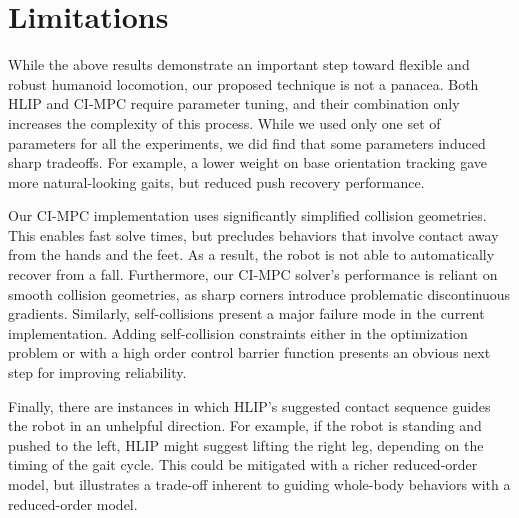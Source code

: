 \section{Limitations} \label{sec:limitations}

While the above results demonstrate an important step toward flexible and robust humanoid locomotion, our proposed technique is not a panacea. 
%
Both HLIP and CI-MPC require parameter tuning, and their combination only increases the complexity of this process. While we used only one set of parameters for all the experiments, we did find that some parameters induced sharp tradeoffs. For example, a lower weight on base orientation tracking gave more natural-looking gaits, but reduced push recovery performance.
%


Our CI-MPC implementation uses significantly simplified collision geometries. This enables fast solve times, but precludes behaviors that involve contact away from the hands and the feet. As a result, the robot is not able to automatically recover from a fall. Furthermore, our CI-MPC solver's performance is reliant on smooth collision geometries, as sharp corners introduce problematic discontinuous gradients. 
%
Similarly, self-collisions present a major failure mode in the current implementation. Adding self-collision constraints either in the optimization problem \cite{grandia2021multi} or with a high order control barrier function \cite{khazoom2024tailoring, ames2019control, singletary2021safety} presents an obvious next step for improving reliability.

Finally, there are instances in which HLIP's suggested contact sequence guides the robot in an unhelpful direction. For example, if the robot is standing and pushed to the left, HLIP might suggest lifting the right leg, depending on the timing of the gait cycle. This could be mitigated with a richer reduced-order model, but illustrates a trade-off inherent to guiding whole-body behaviors with a reduced-order model.
